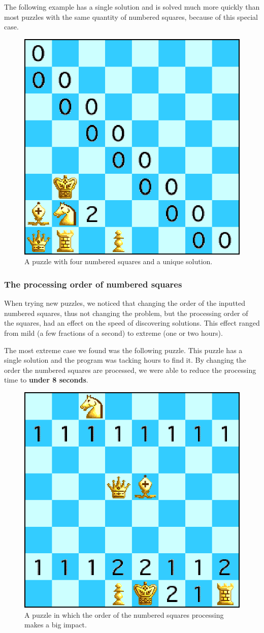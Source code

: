 \documentclass[runningheads]{llncs}
\begin{document}
The following example has a single solution and is solved much more quickly
than most puzzles with the same quantity of numbered squares, because of this
special case.

\begin{figure}[H]
  \centering
  \includegraphics[width=0.4\linewidth]{figures/chess8.eps}
  \caption{A puzzle with four numbered squares and a unique solution.}\label{fig:fig5}
\end{figure}

\subsubsection{The processing order of numbered squares}
When trying new puzzles, we noticed that changing the order of the inputted
numbered squares, thus not changing the problem, but the processing order
of the squares, had an effect on the speed of discovering solutions. This
effect ranged from mild (a few fractions of a second) to extreme (one or two
hours).

The most extreme case we found was the following puzzle. This puzzle has a single
solution and the program was tacking hours to find it. By changing the order
the numbered squares are processed, we were able to reduce the processing time
to \textbf{under 8 seconds}.

\begin{figure}[H]
  \centering
  \includegraphics[width=0.4\linewidth]{figures/chess7.eps}
  \caption{A puzzle in which the order of the numbered squares processing makes a big impact.}\label{fig:fig6}
\end{figure}
\end{document}
